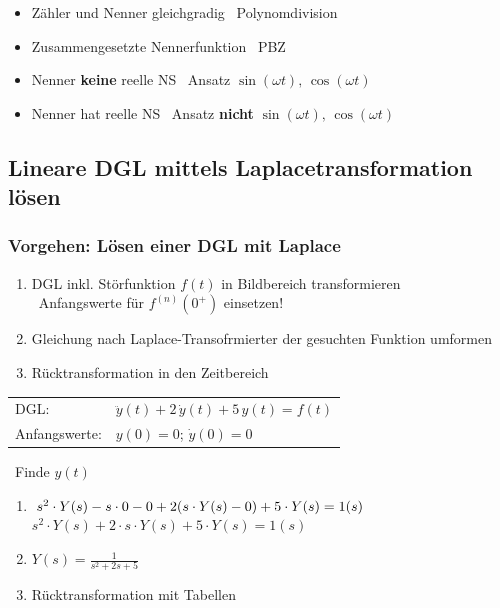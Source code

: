 \begin{itemize}
    \item Zähler und Nenner gleichgradig \textrightarrow\ Polynomdivision
    \item Zusammengesetzte Nennerfunktion \textrightarrow\ PBZ
    \item Nenner \textbf{keine} reelle NS \textrightarrow\ Ansatz $ \sin(\omega t), \, \cos(\omega t)$
    \item Nenner hat reelle NS \textrightarrow\ Ansatz \textbf{nicht} $\sin(\omega t), \, \cos(\omega t)$
\end{itemize}


\subsection{Lineare DGL mittels Laplacetransformation lösen}

\subsubsection{Vorgehen: Lösen einer DGL mit Laplace}

\begin{enumerate}
    \item DGL inkl. Störfunktion $f(t)$ in Bildbereich transformieren \\
        \textrightarrow\ Anfangswerte für $f^{(n)}(0^+)$ einsetzen!
    \item Gleichung nach Laplace-Transofrmierter der gesuchten Funktion umformen
    \item Rücktransformation in den Zeitbereich
\end{enumerate}



\begin{minipage}[c]{0.6\columnwidth}
    \begin{tabular}{ll}
        DGL:            & $\ddot{y}(t) + 2 \, \dot{y}(t) + 5 \, y(t) = f(t)$ \\
        Anfangswerte:   & $y(0) = 0$; \quad $\dot{y}(0) = 0$
    \end{tabular}
\end{minipage}
\hfill
\begin{minipage}[c]{0.35\columnwidth}
    \textrightarrow\ Finde $y(t)$
\end{minipage}

\vspace{0.2cm}

\begin{enumerate}
    \setlength\itemsep{3pt}
    \item $\relax \; s^2 \cdot Y(s) - s \cdot 0 - 0 + 2( s \cdot Y(s) - 0) + 5 \cdot Y(s) = 1(s)$ \\
        $s^2 \cdot Y(s)+ 2 \cdot s \cdot Y(s) + 5 \cdot Y(s) = 1(s)$
    \item $Y(s) = \frac{1}{s^2 + 2s +5}$
    \item Rücktransformation mit Tabellen
\end{enumerate}


